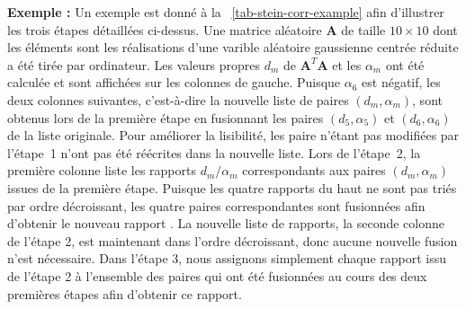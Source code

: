    \bigskip\noindent%
    \textbf{Exemple :} Un exemple est donné à la \tabname~\ref{tab-stein-corr-example} afin d'illustrer les trois étapes détaillées ci-dessus. Une matrice aléatoire $\mathbf{A}$ de taille $10\times 10$ dont les éléments sont les réalisations d'une varible aléatoire gaussienne centrée réduite a été tirée par ordinateur. Les valeurs propres $d_m$ de $\mathbf{A}^T\mathbf{A}$ et les $\alpha_m$ ont été calculée et sont affichées sur les colonnes de gauche. Puisque $\alpha_6$ est négatif, les deux colonnes suivantes, c'est-à-dire la nouvelle liste de paires $(d_m, \alpha_m)$, sont obtenus lors de la première étape en fusionnant les paires $(d_5, \alpha_5)$ et $(d_6,\alpha_6)$ de la liste originale. Pour améliorer la lisibilité, les paire n'étant pas modifiées par l'étape~1 n'ont pas été réécrites dans la nouvelle liste. Lors de l'étape~2, la première colonne liste les rapports $d_m/\alpha_m$ correspondants aux paires $(d_m, \alpha_m)$ issues de la première étape. Puisque les quatre rapports du haut ne sont pas triés par ordre décroissant, les quatre paires correspondantes sont fusionnées afin d'obtenir le nouveau rapport . La nouvelle liste de rapports, \ie{} la seconde colonne de l'étape 2, est maintenant dans l'ordre décroissant, donc aucune nouvelle fusion n'est nécessaire. Dans l'étape 3, nous assignons simplement chaque rapport issu de l'étape 2 à l'ensemble des paires qui ont été fusionnées au cours des deux premières étapes afin d'obtenir ce rapport.
    
    
    
